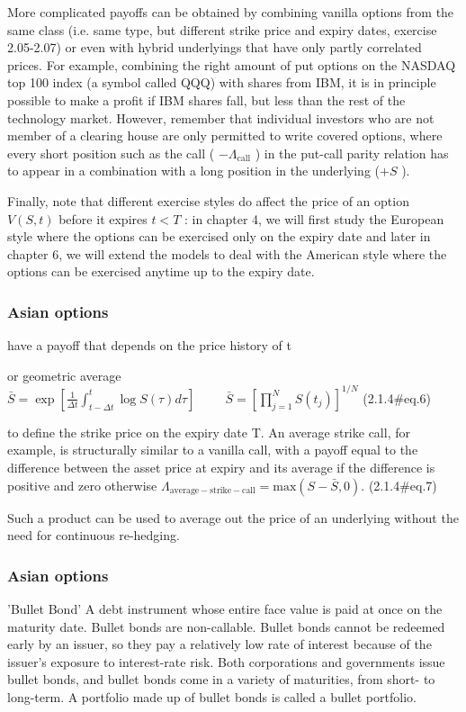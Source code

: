 \documentclass{beamer}
\begin{document}
\begin{frame}

More complicated payoffs can be obtained by combining vanilla options from the same class (i.e. same type, but different strike price and expiry dates, exercise 2.05-2.07) or even with hybrid underlyings that have only partly correlated prices. For example, combining the right amount of put options on the NASDAQ top 100 index (a symbol called QQQ) with shares from IBM, it is in principle possible to make a profit if IBM shares fall, but less than the rest of the technology market. However, remember that individual investors who are not member of a clearing house are only permitted to write covered options, where every short position such as the call ( $ -\Lambda_\mathrm{call}$ ) in the put-call parity relation has to appear in a combination with a long position in the underlying ($ +S$ ).

Finally, note that different exercise styles do affect the price of an option $ V(S,t)$ before it expires $ t<T$ : in chapter 4, we will first study the European style where the options can be exercised only on the expiry date and later in chapter 6, we will extend the models to deal with the American style where the options can be exercised anytime up to the expiry date.


\end{frame}
\begin{frame}
\frametitle{Asian options}
have a payoff that depends on the price history of t


or geometric average
 $\displaystyle \bar{S}=\exp\left[\frac{1}{\Delta t}\int_{t-\Delta t}^{t} \log S(\tau)d\tau \right]\hspace{1cm} \bar{S}=\left[\prod_{j=1}^N S(t_j)\right]^{1/N}$	 (2.1.4#eq.6)


to define the strike price on the expiry date T. An average strike call, for example, is structurally similar to a vanilla call, with a payoff equal to the difference between the asset price at expiry and its average if the difference is positive and zero otherwise
 $\displaystyle \Lambda_\mathrm{average-strike-call}=\mathrm{max}(S-\bar{S},0).$	 (2.1.4#eq.7)


Such a product can be used to average out the price of an underlying without the need for continuous re-hedging.

\end{frame}



\begin{frame}
\frametitle{Asian options}

'Bullet Bond'
A debt instrument whose entire face value is paid at once on the maturity date. Bullet bonds are non-callable. Bullet bonds cannot be redeemed early by an issuer, so they pay a relatively low rate of interest because of the issuer's exposure to interest-rate risk. Both corporations and governments issue bullet bonds, and bullet bonds come in a variety of maturities, from short- to long-term. A portfolio made up of bullet bonds is called a bullet portfolio. 
\end{frame}
\end{document}
